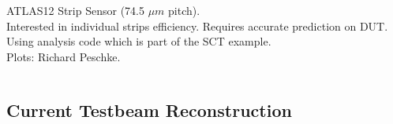 \documentclass{beamer}
\begin{document}
\begin{frame}
\begin{columns}[t]
\tiny{
\vspace{10pt}
ATLAS12 Strip Sensor (74.5 $\mu m$ pitch). \\
\vspace{10pt}
Interested in individual strips efficiency. Requires accurate prediction on DUT.\\
\vspace{10pt}
Using analysis code which is part of the SCT example.\\
\vspace{10pt}
Plots: Richard Peschke.
}
\end{columns}
\end{frame}

\subsection{Current Testbeam Reconstruction}
\end{document}
